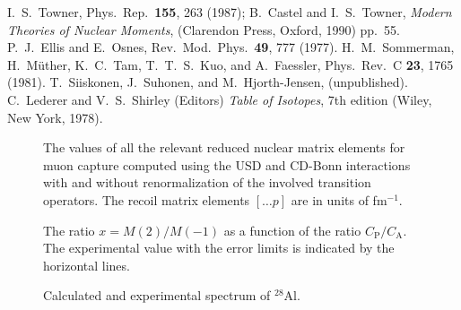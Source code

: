 \begin{multicols}{2}
\begin{thebibliography}{100}
 I.\ S.\ Towner, Phys.\ Rep.\ {\bf 155}, 263 (1987); B.\ Castel
        and I.\ S.\ Towner, {\em Modern Theories
        of Nuclear Moments}, (Clarendon Press, Oxford, 1990) pp.\ 55.
 P.\ J.\ Ellis and E.\ Osnes, Rev.\ Mod.\ Phys.\
        {\bf 49}, 777 (1977).
H.\ M.\ Sommerman, H.\ M\"uther, K.\ C.\
Tam, T.\ T.\ S.\ Kuo, and A.\ Faessler, Phys.\ Rev.\
C {\bf 23}, 1765 (1981).
\bibitem{ssh98} T.\ Siiskonen, J.\ Suhonen, and M.\ Hjorth-Jensen,
        (unpublished).
\bibitem{lede} C.\ Lederer and V.\ S.\ Shirley (Editors) {\em Table of Isotopes},
        7th edition (Wiley, New York, 1978).
\end{thebibliography}

\end{multicols}

\begin{figure}
        \caption{The values of all the relevant
         reduced nuclear matrix
        elements for muon capture computed using the USD and CD-Bonn
        interactions with and
        without renormalization of the involved transition operators.
        The recoil matrix elements $[\dots p]$ are
        in units of fm$^{-1}$.}
        \label{nme}
\end{figure}

\begin{figure}
        \caption{The ratio $x=M(2)/M(-1)$ as a function of the ratio
        $C_{\mathrm P}/C_{\mathrm A}$. The experimental
        value \protect\cite{MOF97} with the error
        limits is indicated by the horizontal lines.}
        \label{x}
\end{figure}

\begin{figure}
        \caption{Calculated and experimental \cite{lede} spectrum of
        $^{28}$Al.}
        \label{spec}
\end{figure}


